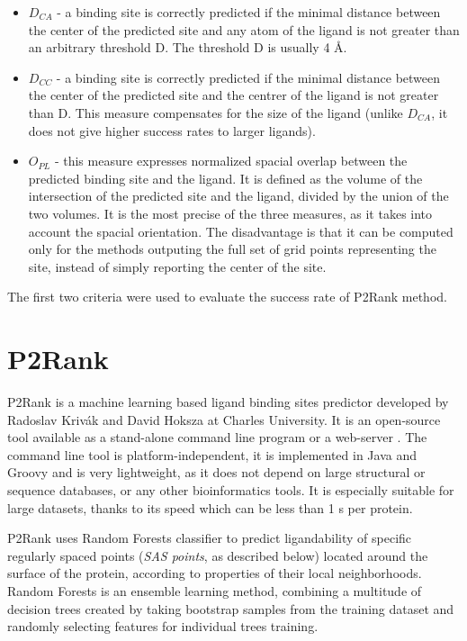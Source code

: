 \begin{itemize}
\item $D_{CA}$ - a binding site is correctly predicted if the minimal distance between the center of the predicted site and any atom of the ligand is not greater than an arbitrary threshold D. The threshold D is usually 4 {\AA}.
\item $D_{CC}$ - a binding site is correctly predicted if the minimal distance between the center of the predicted site and the centrer of the ligand is not greater than D. This measure compensates for the size of the ligand (unlike $D_{CA}$, it does not give higher success rates to larger ligands).
\item $O_{PL}$ - this measure expresses normalized spacial overlap between the predicted binding site and the ligand. It is defined as the volume of the intersection of the predicted site and the ligand, divided by the union of the two volumes. It is the most precise of the three measures, as it takes into account the spacial orientation. The disadvantage is that it can be computed only for the methods outputing the full set of grid points representing the site, instead of simply reporting the center of the site.
\end{itemize}

The first two criteria were used to evaluate the success rate of P2Rank method.

\section{P2Rank}

P2Rank \cite{p2rank1} is a machine learning based ligand binding sites predictor developed by Radoslav Krivák and David Hoksza at Charles University. It is an open-source tool available as a stand-alone command line program or a web-server \cite{prankweb}. The command line tool is platform-independent, it is implemented in Java and Groovy and is very lightweight, as it does not depend on large structural or sequence databases, or any other bioinformatics tools. It is especially suitable for large datasets, thanks to its speed which can be less than 1 s per protein. 

P2Rank uses Random Forests classifier \cite{randomforests} to predict ligandability of specific regularly spaced points (\textit{SAS points}, as described below) located around the surface of the protein, according to properties of their local neighborhoods. Random Forests is an ensemble learning method, combining a multitude of decision trees created by taking bootstrap samples from the training dataset and randomly selecting features for individual trees training.

